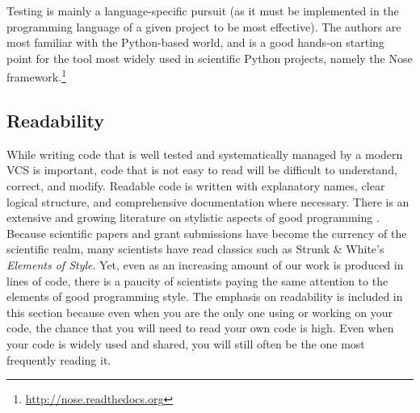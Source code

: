 \documentclass[ChapterTOCs,krantz2]{krantz} %
\begin{document}
Testing is mainly a language-specific pursuit (as it must be implemented in the
programming language of a given project to be most effective).  The authors are
most familiar with the Python-based world, and \cite{ctb-nose:2006} is a good
hands-on starting point for the tool most widely used in scientific Python
projects, namely the Nose
framework.\footnote{\url{http://nose.readthedocs.org}}


\subsection{\label{subsec:readability}Readability}

While writing code that is well tested and systematically managed by a modern
VCS is important, code that is not easy to read will be difficult to
understand, correct, and modify. Readable code is written with explanatory
names, clear logical structure, and comprehensive documentation where
necessary.  There is an extensive and growing literature on stylistic
aspects of good programming \cite{boswell2011art, Fow00, kernighan1999practice,
HT00, mcconnell2009code}. Because scientific papers and grant submissions have
become the currency of the scientific realm, many scientists have read classics
such as Strunk \& White's \emph{Elements of Style}. Yet, even as an increasing
amount of our work is produced in lines of code, there is a paucity of
scientists paying the same attention to the elements of good programming style.
The emphasis on readability is included in this section because even when you
are the only one using or working on your code, the chance that you will need
to read your own code is high. Even when your code is widely used and shared,
you will still often be the one most frequently reading it.
\end{document}
